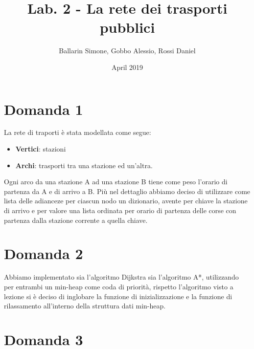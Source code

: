 \documentclass{article}
\title{Lab. 2 - La rete dei trasporti pubblici}
\author{Ballarin Simone, Gobbo Alessio, Rossi Daniel}
\date{April 2019}
\begin{document}
\maketitle

\section*{Domanda 1}
La rete di traporti è stata modellata come segue:
\begin{itemize}
	\item \textbf{Vertici}: stazioni
	\item \textbf{Archi}: trasporti tra una stazione ed un'altra.
\end{itemize}
Ogni arco da una stazione A ad una stazione B tiene come peso l'orario di partenza da A e di arrivo a B.
Più nel dettaglio abbiamo deciso di utilizzare come lista delle adianceze per ciascun nodo un dizionario, avente per chiave la stazione di arrivo e per valore una lista ordinata per orario di partenza delle corse con partenza dalla stazione corrente a quella chiave.

\section*{Domanda 2}
Abbiamo implementato sia l'algoritmo Dijkstra sia l'algoritmo A*, utilizzando per entrambi un min-heap come coda di priorità, rispetto l'algoritmo visto a lezione si è deciso di inglobare la funzione di inizializzazione e la funzione di rilassamento all'interno della struttura dati min-heap.

\section*{Domanda 3}
\end{document}
